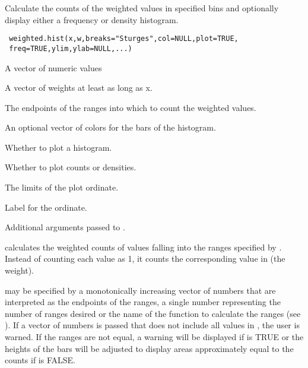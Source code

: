 \begin{Description}\relax
Calculate the counts of the weighted values in specified bins and 
optionally display either a frequency or density histogram.
\end{Description}
\begin{Usage}
\begin{verbatim}
 weighted.hist(x,w,breaks="Sturges",col=NULL,plot=TRUE,
 freq=TRUE,ylim,ylab=NULL,...)
\end{verbatim}
\end{Usage}
\begin{Arguments}
\begin{ldescription}
\item[\code{x}] A vector of numeric values
\item[\code{w}] A vector of weights at least as long as x.
\item[\code{breaks}] The endpoints of the ranges into which to count the weighted
values.
\item[\code{col}] An optional vector of colors for the bars of the histogram.
\item[\code{plot}] Whether to plot a histogram.
\item[\code{freq}] Whether to plot counts or densities.
\item[\code{ylim}] The limits of the plot ordinate.
\item[\code{ylab}] Label for the ordinate.
\item[\code{...}] Additional arguments passed to .
\end{ldescription}
\end{Arguments}
\begin{Details}\relax
{} calculates the weighted counts of values falling 
into the ranges specified by . Instead of counting each 
value as 1, it counts the corresponding value in  (the weight).

 may be specified by a monotonically increasing vector 
of numbers that are interpreted as the endpoints of the ranges, a 
single number representing the number of ranges desired or the name 
of the function to calculate the ranges (see ).
If a vector of numbers is passed that does not include all values in 
, the user is warned. If the ranges are not equal, a warning 
will be displayed if  is TRUE or the heights of the bars 
will be adjusted to display areas approximately equal to the counts 
if  is FALSE.
\end{Details}
